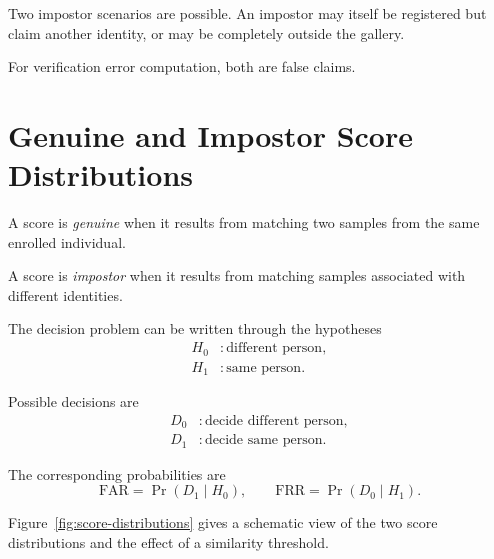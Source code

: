 \documentclass[11pt,a4paper,oneside]{report}
\newcommand{\Prob}{\Pr}
\begin{document}
Two impostor scenarios are possible. An impostor may itself be registered but claim another identity, or may be completely outside the gallery.

For verification error computation, both are false claims.

\section{Genuine and Impostor Score Distributions}
\label{subsec:score-distributions}

A score is \emph{genuine} when it results from matching two samples from
the same enrolled individual.

A score is \emph{impostor} when it results from matching samples
associated with different identities.

The decision problem can be written through the hypotheses
\[
\begin{aligned}
H_0 &: \text{different person},\\
H_1 &: \text{same person}.
\end{aligned}
\]

Possible decisions are
\[
\begin{aligned}
D_0 &: \text{decide different person},\\
D_1 &: \text{decide same person}.
\end{aligned}
\]

The corresponding probabilities are
\begin{equation}
\mathrm{FAR}
=
\Prob(D_1\mid H_0),
\qquad
\mathrm{FRR}
=
\Prob(D_0\mid H_1).
\label{eq:hypothesis-errors}
\end{equation}

Figure~\ref{fig:score-distributions} gives a schematic view of the two
score distributions and the effect of a similarity threshold.
\end{document}

